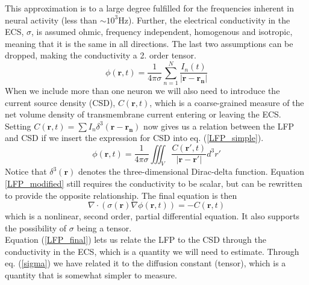 \documentclass[a4paper,english, 12pt, twoside]{article}
\begin{document}
This approximation is to a large degree fulfilled for the frequencies inherent in neural activity (less than $\sim 10^3$Hz). 
Further, the electrical conductivity in the ECS, $\sigma$, is assumed ohmic, frequency independent, homogenous and isotropic, meaning that it is the same in all directions. 
The last two assumptions can be dropped, making the conductivity a 2. order tensor.
\begin{equation}\label{LFP_simple}
 \phi(\mathbf{r},t) = \frac{1}{4\pi\sigma}\sum\limits_{n=1}^N\frac{I_n(t)}{|\mathbf{r}-\mathbf{r_n}|}
\end{equation}
When we include more than one neuron we will also need to introduce the current source density (CSD), $C(\mathbf{r},t)$, which is a coarse-grained measure of the net volume density of transmembrane current entering or leaving the ECS. 
Setting $C(\mathbf{r},t) = \sum I_n\delta^3(\mathbf{r}-\mathbf{r_n})$ now gives us a relation between the LFP and CSD if we insert the expression for CSD into eq. (\ref{LFP_simple}).
\begin{equation}\label{LFP_modified}
  \phi(\mathbf{r},t) = \frac{1}{4\pi\sigma}\iiint_{V}\frac{C(\mathbf{r'},t)}{|\mathbf{r}-\mathbf{r'}|}d^3r'
\end{equation}
Notice that $\delta^3(\mathbf{r})$ denotes the three-dimensional Dirac-delta function. 
Equation \ref{LFP_modified} still requires the conductivity to be scalar, but can be rewritten to provide the opposite relationship. 
The final equation is then 
\begin{equation}\label{LFP_final}
 \nabla\cdot(\sigma(\mathbf{r})\nabla\phi(\mathbf{r},t)) = -C(\mathbf{r},t)
\end{equation}
which is a nonlinear, second order, partial differential equation. It also supports the possibility of $\sigma$ being a tensor.\\
Equation (\ref{LFP_final}) lets us relate the LFP to the CSD through the conductivity in the ECS, which is a quantity we will need to estimate. 
Through eq. (\ref{sigma}) we have related it to the diffusion constant (tensor), which is a quantity that is somewhat simpler to measure.
\end{document}
